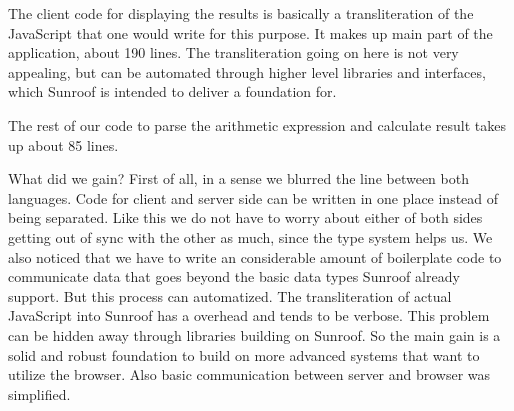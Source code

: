 The client code for displaying the results is basically a 
transliteration of the JavaScript that one would write for this 
purpose. It makes up main part of the application, about 190 lines.
The transliteration going on here is not very appealing, but can 
be automated through higher level libraries and interfaces, which
Sunroof is intended to deliver a foundation for.

The rest of our code to parse the arithmetic expression and calculate 
result takes up about 85 lines. 

What did we gain? First of all, in a sense we blurred the line between
both languages. Code for client and server side can be written in one place
instead of being separated. Like this we do not have to worry about 
either of both sides getting out of sync with the other as much, since
the type system helps us. We also noticed that we have to write
an considerable amount of boilerplate code to communicate data that goes beyond 
the basic data types Sunroof already support. But this process can automatized.
The transliteration of actual JavaScript into Sunroof has a overhead and
tends to be verbose. This problem can be hidden away through libraries building
on Sunroof. So the main gain is a solid and robust foundation to build
on more advanced systems that want to utilize the browser. Also basic
communication between server and browser was simplified.


